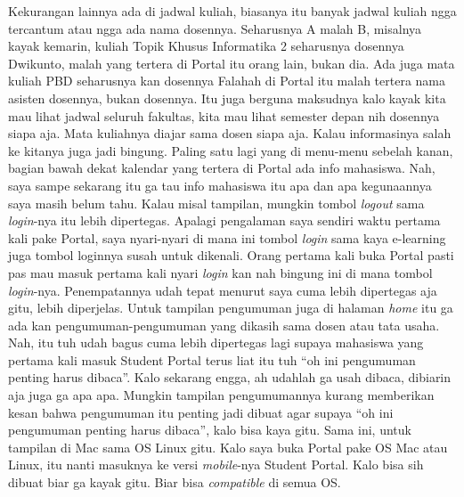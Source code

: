 \begin{enumerate}
Kekurangan lainnya ada di jadwal kuliah, biasanya itu banyak jadwal kuliah ngga tercantum atau ngga ada nama dosennya. Seharusnya A malah B, misalnya kayak kemarin, kuliah Topik Khusus Informatika 2 seharusnya dosennya Dwikunto, malah yang tertera di Portal itu orang lain, bukan dia. Ada juga mata kuliah PBD seharusnya kan dosennya Falahah di Portal itu malah tertera nama asisten dosennya, bukan dosennya. Itu juga berguna maksudnya kalo kayak kita mau lihat jadwal seluruh fakultas, kita mau lihat semester depan nih dosennya siapa aja. Mata kuliahnya diajar sama dosen siapa aja. Kalau informasinya salah ke kitanya juga jadi bingung. Paling satu lagi yang di menu-menu sebelah kanan, bagian bawah dekat kalendar yang tertera di Portal ada info mahasiswa. Nah, saya sampe sekarang itu ga tau info mahasiswa itu apa dan apa kegunaannya saya masih belum tahu. Kalau misal tampilan, mungkin tombol \textit{logout} sama \textit{login}-nya itu lebih dipertegas. Apalagi pengalaman saya sendiri waktu pertama kali pake Portal, saya nyari-nyari di mana ini tombol \textit{login} sama kaya e-learning juga tombol loginnya susah untuk dikenali. Orang pertama kali buka Portal pasti pas mau masuk pertama kali nyari \textit{login} kan nah bingung ini di mana tombol \textit{login}-nya. Penempatannya udah tepat menurut saya cuma lebih dipertegas aja gitu, lebih diperjelas. Untuk tampilan pengumuman juga di halaman \textit{home} itu ga ada kan pengumuman-pengumuman yang dikasih sama dosen atau tata usaha. Nah, itu tuh udah bagus cuma lebih dipertegas lagi supaya mahasiswa yang pertama kali masuk Student Portal terus liat itu tuh ``oh ini pengumuman penting harus dibaca''. Kalo sekarang engga, ah udahlah ga usah dibaca, dibiarin aja juga ga apa apa. Mungkin tampilan pengumumannya kurang memberikan kesan bahwa pengumuman itu penting jadi dibuat agar supaya ``oh ini pengumuman penting harus dibaca'', kalo bisa kaya gitu. Sama ini, untuk tampilan di Mac sama OS Linux gitu. Kalo saya buka Portal pake OS Mac atau Linux, itu nanti masuknya ke versi \textit{mobile}-nya Student Portal. Kalo bisa sih dibuat biar ga kayak gitu. Biar bisa \textit{compatible} di semua OS.\\
	

\end{enumerate}

